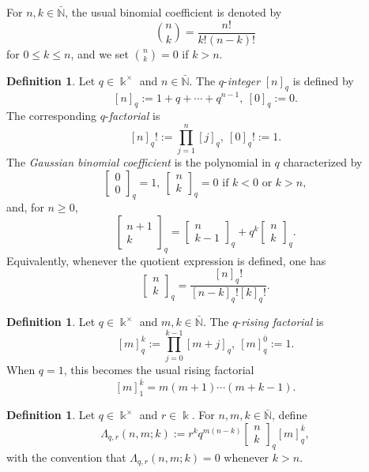 \documentclass{amsart}
\theoremstyle{definition}
\newtheorem{definition}[theorem]{Definition}
\theoremstyle{remark}
\numberwithin{equation}{section}
\begin{document}
For $n,k\in\bar{\mathbb{N}}$, the usual binomial coefficient is denoted by
\[
\binom{n}{k}
=
\frac{n!}{k!(n-k)!}
\]
for $0\le k\le n$, and we set $\binom{n}{k}=0$ if $k>n$.

\begin{definition}\label{DefinitionQIntegers}
Let $q\in\Bbbk^\times$ and $n\in\bar{\mathbb{N}}$. The $q$-\emph{integer} $[n]_q$ is defined by
\[
[n]_q:=1+q+\cdots+q^{n-1},
\ [0]_q:=0.
\]
The corresponding $q$-\emph{factorial} is
\[
[n]_q!:=\prod_{j=1}^n [j]_q,
\ [0]_q!:=1.
\]
The \emph{Gaussian binomial coefficient} is the polynomial in $q$ characterized by
\[
\begin{bmatrix}
0\\
0
\end{bmatrix}_q=1,\
\begin{bmatrix}
n\\
k
\end{bmatrix}_q=0
\text{ if }k<0\text{ or }k>n,
\]
and, for $n\ge0$,
\[
\begin{bmatrix}
n+1\\
k
\end{bmatrix}_q
=
\begin{bmatrix}
n\\
k-1
\end{bmatrix}_q
+
q^k
\begin{bmatrix}
n\\
k
\end{bmatrix}_q.
\]
Equivalently, whenever the quotient expression is defined, one has
\[
\begin{bmatrix}
n\\
k
\end{bmatrix}_q
=
\frac{[n]_q!}{[n-k]_q![k]_q!}.
\]
\end{definition}

\begin{definition}\label{DefinitionQRisingFactorial}
Let $q\in\Bbbk^\times$ and $m,k\in\bar{\mathbb{N}}$. The $q$-\emph{rising factorial} is
\[
[m]_{q}^{\overline{k}}
:=
\prod_{j=0}^{k-1}[m+j]_q,
\
[m]_{q}^{\overline{0}}:=1.
\]
When $q=1$, this becomes the usual rising factorial
\[
[m]_1^{\overline{k}}
=
m(m+1)\cdots(m+k-1).
\]
\end{definition}

\begin{definition}\label{DefinitionLambdaCoefficients}
Let $q\in\Bbbk^\times$ and $r\in\Bbbk$. For $n,m,k\in\bar{\mathbb{N}}$, define
\[
\Lambda_{q,r}(n,m;k)
:=
r^kq^{m(n-k)}
\begin{bmatrix}
n\\
k
\end{bmatrix}_{q}
[m]_{q}^{\overline{k}},
\]
with the convention that $\Lambda_{q,r}(n,m;k)=0$ whenever $k>n$.
\end{definition}
\end{document}
